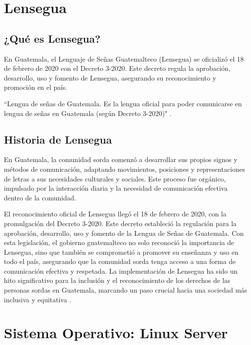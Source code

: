 \section{Lensegua}

\subsection{¿Qué es Lensegua?}
En Guatemala, el Lenguaje de Señas Guatemalteco (Lensegua) se oficializó el 18 de febrero de 2020 con el Decreto 3-2020. Este decreto regula la aprobación, desarrollo, uso y fomento de Lensegua, asegurando su reconocimiento y promoción en el país. 

``Lengua de señas de Guatemala. Es la lengua oficial para poder comunicarse en lengua de señas en Guatemala (según Decreto 3-2020)" \cite{Lensegua}.

\subsection{Historia de Lensegua}
En Guatemala, la comunidad sorda comenzó a desarrollar sus propios signos y métodos de comunicación, adaptando movimientos, posiciones y representaciones de letras a sus necesidades culturales y sociales. Este proceso fue orgánico, impulsado por la interacción diaria y la necesidad de comunicación efectiva dentro de la comunidad.

El reconocimiento oficial de Lensegua llegó el 18 de febrero de 2020, con la promulgación del Decreto 3-2020. Este decreto estableció la regulación para la aprobación, desarrollo, uso y fomento de la Lengua de Señas de Guatemala. Con esta legislación, el gobierno guatemalteco no solo reconoció la importancia de Lensegua, sino que también se comprometió a promover su enseñanza y uso en todo el país, asegurando que la comunidad sorda tenga acceso a una forma de comunicación efectiva y respetada. La implementación de Lensegua ha sido un hito significativo para la inclusión y el reconocimiento de los derechos de las personas sordas en Guatemala, marcando un paso crucial hacia una sociedad más inclusiva y equitativa \cite{LenseguaHistoria}.

\section{Sistema Operativo: Linux Server}

